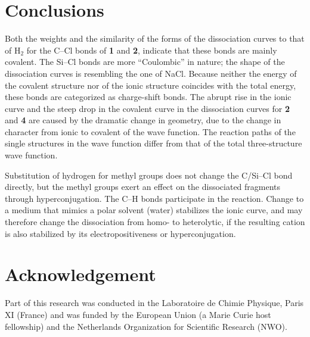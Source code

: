 \section{Conclusions}

Both the weights and the similarity of the forms of the dissociation curves to that of H$_2$ for the C--Cl bonds of \textbf{1} and \textbf{2}, indicate that these bonds are mainly covalent.  The Si--Cl bonds are more ``Coulombic'' in nature; the shape of the dissociation curves is resembling the one of NaCl. Because neither the energy of the covalent structure nor of the ionic structure coincides with the total energy, these bonds are categorized as charge-shift bonds. The abrupt rise in the ionic curve and the steep drop in the covalent curve in the dissociation curves for \textbf{2} and \textbf{4} are caused by the dramatic change in geometry, due to the change in character from ionic to covalent of the wave function. The reaction paths of the single structures in the wave function differ from that of the total three-structure wave function.

Substitution of hydrogen for methyl groups does not change the C/Si--Cl bond directly, but the methyl groups exert an effect on the dissociated fragments through hyperconjugation.  The C--H bonds participate in the reaction.  Change to a medium that mimics a polar solvent (water) stabilizes the ionic curve, and may therefore change the dissociation from homo- to heterolytic, if the resulting cation is also stabilized by its electropositiveness or hyperconjugation.
 
\section*{Acknowledgement}

Part of this research was conducted in the Laboratoire de Chimie Physique, Paris XI (France) and was funded by the European Union (a Marie Curie host fellowship) and the Netherlands Organization for Scientific Research (NWO).



